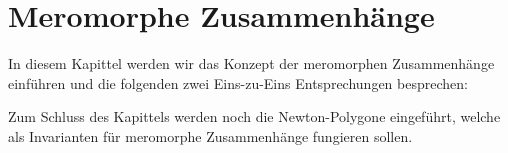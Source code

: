 \chapter{Meromorphe Zusammenhänge}

In diesem Kapittel werden wir das Konzept der meromorphen Zusammenhänge
einführen und die folgenden zwei Eins-zu-Eins Entsprechungen besprechen:
\begin{center}
\end{center}
Zum Schluss des Kapittels werden noch die Newton-Polygone eingeführt, welche
als Invarianten für meromorphe Zusammenhänge fungieren sollen.

\begin{comment}
Sei $\cM$ ein $\cD$-Modul ungleich Null von endlichem Typ. Falls die
links-Multiplikation mit $x$ bijektiv ist, so nennen wir $\cM$ einen
meromorphen Zusammenhang. \cite[Chap 4]{sabbah_cimpa90}
\end{comment}

